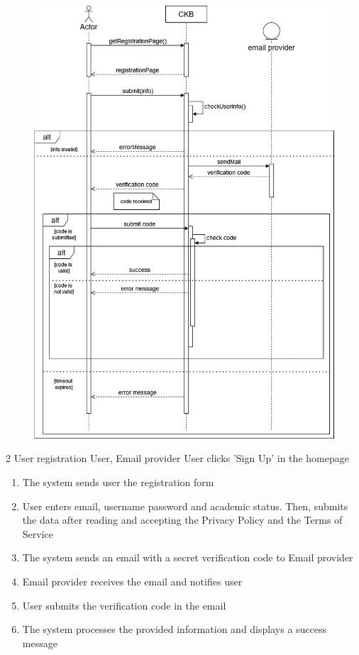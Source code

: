\usecase
{
    \begin{figure}[H]
        \centering
        \includegraphics[width=\textwidth]{src/sequence_diagrams/register.png}
    \end{figure}
}
{2}
{User registration} %
{User, Email provider} %
{User clicks 'Sign Up' in the homepage} %
{ %
    \begin{enumerate}
        \item The system sends user the registration form
        \item User enters email, username password and academic status. Then, submits the data after reading and accepting the Privacy Policy and the Terms of Service
        \item The system sends an email with a secret verification code to Email provider
        \item Email provider receives the email and notifies user
        \item User submits the verification code in the email
        \item The system processes the provided information and displays a success message
    \end{enumerate}
}
